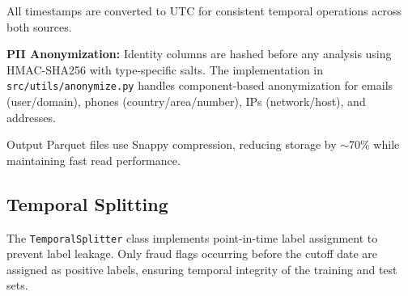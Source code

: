 All timestamps are converted to UTC for consistent temporal operations across both sources.

\textbf{PII Anonymization:} Identity columns are hashed before any analysis using HMAC-SHA256 with type-specific salts. The implementation in \texttt{src/utils/anonymize.py} handles component-based anonymization for emails (user/domain), phones (country/area/number), IPs (network/host), and addresses.

Output Parquet files use Snappy compression, reducing storage by $\sim$70\% while maintaining fast read performance.

\subsection{Temporal Splitting}
\label{sec:4_3_2}

The \texttt{TemporalSplitter} class implements point-in-time label assignment to prevent label leakage. Only fraud flags occurring before the cutoff date are assigned as positive labels, ensuring temporal integrity of the training and test sets.
